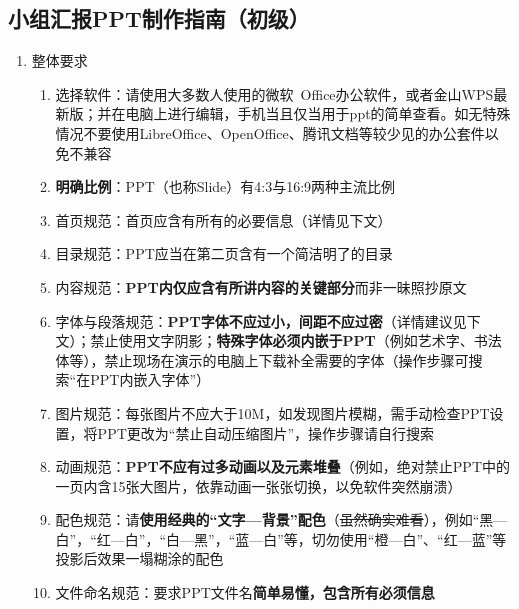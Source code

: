 \subsection[小组汇报PPT制作指南（初级）]{小组汇报PPT制作指南（初级）}
\begin{enumerate}
    \item 整体要求
          \begin{enumerate}
              \item 选择软件：请使用大多数人使用的微软\ Office办公软件，或者金山WPS最新版；并在电脑上进行编辑，手机当且仅当用于ppt的简单查看。如无特殊情况不要使用LibreOffice、OpenOffice、腾讯文档等较少见的办公套件以免不兼容
              \item \textbf{明确比例}：PPT（也称Slide）有4:3与16:9两种主流比例\footnotemark
              \item 首页规范：首页应含有所有的必要信息（详情见下文）
              \item 目录规范：PPT应当在第二页含有一个简洁明了的目录
              \item 内容规范：\textbf{PPT内仅应含有所讲内容的关键部分}而非一昧照抄原文
              \item 字体与段落规范：\textbf{PPT字体不应过小，间距不应过密}（详情建议见下文）；禁止使用文字阴影；\textbf{特殊字体必须内嵌于PPT}（例如艺术字、书法体等），禁止现场在演示的电脑上下载补全需要的字体（操作步骤可搜索“在PPT内嵌入字体”）
              \item 图片规范：每张图片不应大于10M\footnotemark，如发现图片模糊，需手动检查PPT设置，将PPT更改为“禁止自动压缩图片”，操作步骤请自行搜索
              \item 动画规范：\textbf{PPT不应有过多动画以及元素堆叠}（例如，绝对禁止PPT中的一页内含15张大图片，依靠动画一张张切换，以免软件突然崩溃）
              \item 配色规范：请\textbf{使用经典的“文字—背景”配色}（\st{虽然确实难看}），例如“黑—白”，“红—白”，\linebreak[3]“白—黑”，“蓝—白”等，切勿使用“橙—白”、“红—蓝”等投影后效果一塌糊涂的配色\footnotemark
              \item 文件命名规范：要求PPT文件名\textbf{简单易懂，包含所有必须信息}

\end{enumerate}
\end{enumerate}
